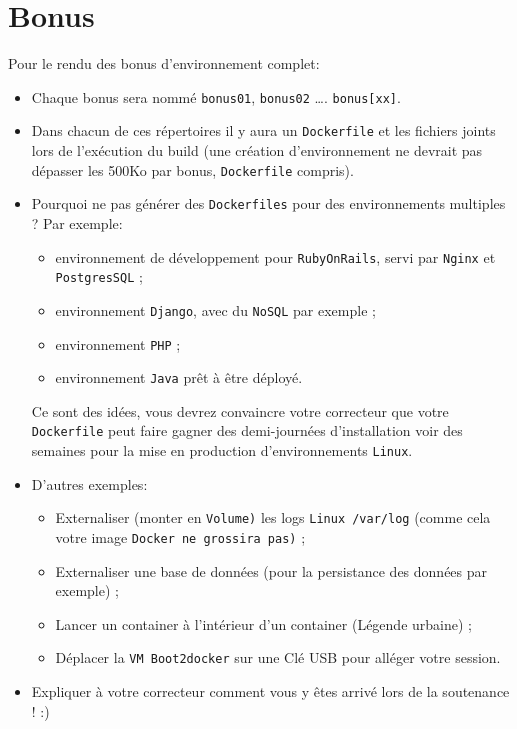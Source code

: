 \documentclass{42}
\begin{document}
\chapter{Bonus}

Pour le rendu des bonus d'environnement complet:
\begin{itemize}
	\item Chaque bonus sera nommé \texttt{bonus01}, \texttt{bonus02} …. \texttt{bonus[xx]}.
	\item Dans chacun de ces répertoires il y aura un \texttt{Dockerfile} et les fichiers joints lors de l’exécution du build (une création d'environnement ne devrait pas dépasser les 500Ko par bonus, \texttt{Dockerfile} compris).
	\item Pourquoi ne pas générer des \texttt{Dockerfiles} pour des environnements multiples ? Par exemple:
	\begin{itemize}
		\item environnement de développement pour \texttt{RubyOnRails}, servi par \texttt{Nginx} et \texttt{PostgresSQL} ;
		\item environnement \texttt{Django}, avec du \texttt{NoSQL} par exemple ;
		\item environnement \texttt{PHP} ;
		\item environnement \texttt{Java} prêt à être déployé.
	\end{itemize}
	Ce sont des idées, vous devrez convaincre votre correcteur que votre \texttt{Dockerfile} peut faire gagner des demi-journées d’installation voir des semaines pour la mise en production d'environnements \texttt{Linux}.
	\item D’autres exemples:
	\begin{itemize}
		\item Externaliser (monter en \texttt{Volume)} les logs \texttt{Linux /var/log} (comme cela votre image \texttt{Docker ne grossira pas)} ;
		\item Externaliser une base de données (pour la persistance des données par exemple) ;
		\item Lancer un container à l'intérieur d’un container (Légende urbaine) ;
		\item Déplacer la \texttt{VM Boot2docker} sur une Clé USB pour alléger votre session.
	\end{itemize}

	\item Expliquer à votre correcteur comment vous y êtes arrivé lors de la soutenance ! :)
\end{itemize}
\end{document}
